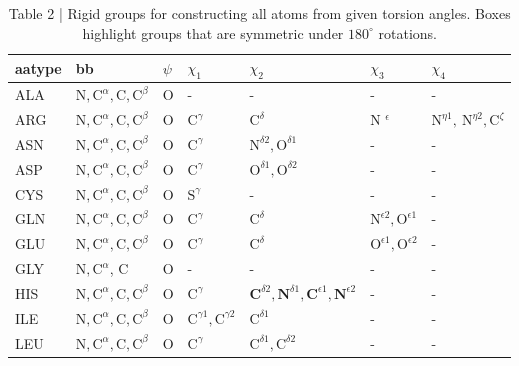 \documentclass[10pt]{article}
\begin{document}
\begin{table}[h]
\begin{center}
\captionsetup{labelformat=empty}
\caption{Table 2 | Rigid groups for constructing all atoms from given torsion angles. Boxes highlight groups that are symmetric under $180^{\circ}$ rotations.}
\begin{tabular}{|l|l|l|l|l|l|l|}
\hline
aatype & bb & $\psi$ & $\chi_{1}$ & $\chi_{2}$ & $\chi_{3}$ & $\chi_{4}$ \\
\hline
ALA & $\mathrm{N}, \mathrm{C}^{\alpha}, \mathrm{C}, \mathrm{C}^{\beta}$ & O & - & - & - & - \\
\hline
ARG & $\mathrm{N}, \mathrm{C}^{\alpha}, \mathrm{C}, \mathrm{C}^{\beta}$ & O & $\mathrm{C}^{\gamma}$ & $\mathrm{C}^{\delta}$ & N ${ }^{\epsilon}$ & $\mathrm{N}^{\eta 1}, \mathrm{~N}^{\eta 2}, \mathrm{C}^{\zeta}$ \\
\hline
ASN & $\mathrm{N}, \mathrm{C}^{\alpha}, \mathrm{C}, \mathrm{C}^{\beta}$ & O & $\mathrm{C}^{\gamma}$ & $\mathrm{N}^{\delta 2}, \mathrm{O}^{\delta 1}$ & - & - \\
\hline
ASP & $\mathrm{N}, \mathrm{C}^{\alpha}, \mathrm{C}, \mathrm{C}^{\beta}$ & O & $\mathrm{C}^{\gamma}$ & $\mathrm{O}^{\delta 1}, \mathrm{O}^{\delta 2}$ & - & - \\
\hline
CYS & $\mathrm{N}, \mathrm{C}^{\alpha}, \mathrm{C}, \mathrm{C}^{\beta}$ & O & $\mathrm{S}^{\gamma}$ & - & - & - \\
\hline
GLN & $\mathrm{N}, \mathrm{C}^{\alpha}, \mathrm{C}, \mathrm{C}^{\beta}$ & O & $\mathrm{C}^{\gamma}$ & $\mathrm{C}^{\delta}$ & $\mathrm{N}^{\epsilon 2}, \mathrm{O}^{\epsilon 1}$ & - \\
\hline
GLU & $\mathrm{N}, \mathrm{C}^{\alpha}, \mathrm{C}, \mathrm{C}^{\beta}$ & O & $\mathrm{C}^{\gamma}$ & $\mathrm{C}^{\delta}$ & $\mathrm{O}^{\epsilon 1}, \mathrm{O}^{\epsilon 2}$ & - \\
\hline
GLY & $\mathrm{N}, \mathrm{C}^{\alpha}$, C & O & - & - & - & - \\
\hline
HIS & $\mathrm{N}, \mathrm{C}^{\alpha}, \mathrm{C}, \mathrm{C}^{\beta}$ & O & $\mathrm{C}^{\gamma}$ & $\mathbf{C}^{\delta 2}, \mathbf{N}^{\delta 1}, \mathbf{C}^{\epsilon 1}, \mathbf{N}^{\epsilon 2}$ & - & - \\
\hline
ILE & $\mathrm{N}, \mathrm{C}^{\alpha}, \mathrm{C}, \mathrm{C}^{\beta}$ & O & $\mathrm{C}^{\gamma 1}, \mathrm{C}^{\gamma 2}$ & $\mathrm{C}^{\delta 1}$ & - & - \\
\hline
LEU & $\mathrm{N}, \mathrm{C}^{\alpha}, \mathrm{C}, \mathrm{C}^{\beta}$ & O & $\mathrm{C}^{\gamma}$ & $\mathrm{C}^{\delta 1}, \mathrm{C}^{\delta 2}$ & - & - \\

\end{tabular}
\end{center}
\end{table}
\end{document}
